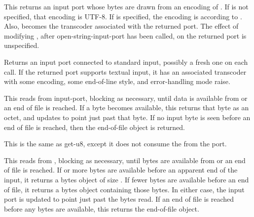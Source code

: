 \begin{entry}{%
}

This returns an input port whose bytes are drawn from an encoding of
.  If  is not specified, that encoding is
UTF-8.  If  is specified, the encoding is according to
.  Also,  becomes the transcoder
associated with the returned port.
The effect of modifying , after {\cf open-string-input-port}
has been called, on the returned port is unspecified.
\end{entry}

\begin{entry}{%
}
   
Returns an input port connected to standard input, possibly a fresh
one on each call.  If the returned port supports textual input, it has
an associated transcoder with some encoding, some end-of-line style,
and error-handling mode {\cf raise}.
\end{entry}

\begin{entry}{%
}
   
This reads from input-port, blocking as necessary, until data is
available from  or an end of file is reached. If a
byte becomes available, this returns that byte as an octet, and
updates  to point just past that byte. If no input
byte is seen before an end of file is reached, then the end-of-file
object is returned.
\end{entry}

\begin{entry}{%
}
   
This is the same as {\cf get-u8}, except it does not consume the
 from the port.
\end{entry}

\begin{entry}{%
}
   
This reads from , blocking as necessary, until 
bytes are available from  or an end of file is
reached. If  or more bytes are available before an apparent end
of the input, it returns a bytes object of size . If fewer
bytes are available before an end of file, it returns a bytes object
containing those bytes. In either case, the input port is updated to
point just past the bytes read.  If an end of file is reached before
any bytes are available, this returns the end-of-file object.
\end{entry}

